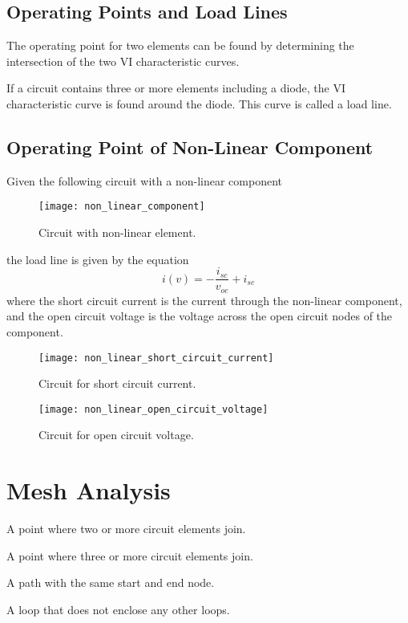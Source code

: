 \documentclass{article}
\begin{document}
\subsection{Operating Points and Load Lines}
\begin{definition}
    The operating point for two elements can be found by determining the intersection
    of the two VI characteristic curves.
\end{definition}
\begin{definition}
    If a circuit contains three or more elements including a diode, the VI characteristic curve
    is found around the diode. This curve is called a load line.
\end{definition}
\subsection{Operating Point of Non-Linear Component}
Given the following circuit with a non-linear component
\begin{figure}[H]
    \centering
    \texttt{[image: non\_linear\_component]}
    \caption{Circuit with non-linear element.}
\end{figure}
the load line is given by the equation
\begin{equation*}
    i(v) = -\frac{i_{sc}}{v_{oc}} + i_{sc}
\end{equation*}
where the short circuit current is the current through the non-linear component, and the open circuit voltage is the voltage across the
open circuit nodes of the component.
\begin{figure}[H]
    \centering
    \texttt{[image: non\_linear\_short\_circuit\_current]}
    \caption{Circuit for short circuit current.}
\end{figure}
\begin{figure}[H]
    \centering
    \texttt{[image: non\_linear\_open\_circuit\_voltage]}
    \caption{Circuit for open circuit voltage.}
\end{figure}
\newpage
\section{Mesh Analysis}
\begin{definition}[Node]
    A point where two or more circuit elements join.
\end{definition}
\begin{definition}
    A point where three or more circuit elements join.
\end{definition}
\begin{definition}[Loop]
    A path with the same start and end node.
\end{definition}
\begin{definition}[Mesh]
    A loop that does not enclose any other loops.
\end{definition}
\end{document}
